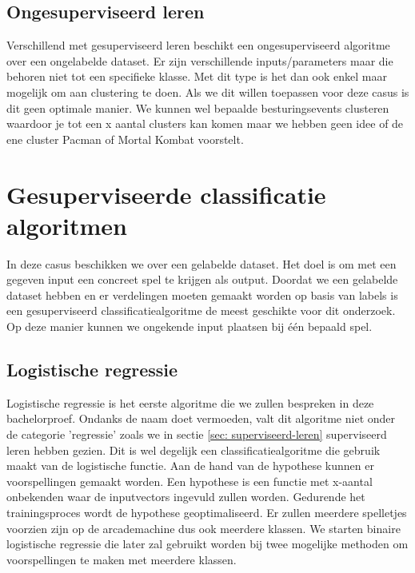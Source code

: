 \subsection*{Ongesuperviseerd leren}
\label{sec: ongesuperviseerd-leren}
Verschillend met gesuperviseerd leren beschikt een ongesuperviseerd algoritme over een ongelabelde dataset. Er zijn verschillende inputs/parameters maar die behoren niet tot een specifieke klasse. Met dit type is het dan ook enkel maar mogelijk om aan clustering te doen. Als we dit willen toepassen voor deze casus is dit geen optimale manier. We kunnen wel bepaalde besturingsevents clusteren waardoor je tot een x aantal clusters kan komen maar we hebben geen idee of de ene cluster Pacman of Mortal Kombat voorstelt. 




\section{Gesuperviseerde classificatie algoritmen}
\label{sec:gesuperviseerde-classificatie-algoritmen}

In deze casus beschikken we over een gelabelde dataset. Het doel is om met een gegeven input een concreet spel te krijgen als output. Doordat we een gelabelde dataset hebben en er verdelingen moeten gemaakt worden op basis van labels is een gesuperviseerd classificatiealgoritme de meest geschikte voor dit onderzoek. Op deze manier kunnen we ongekende input plaatsen bij één bepaald spel.


\subsection{Logistische regressie}
\label{sec:logistische-regressie}

Logistische regressie is het eerste algoritme die we zullen bespreken in deze bachelorproef. Ondanks de naam doet vermoeden, valt dit algoritme niet onder de categorie 'regressie' zoals we in sectie \ref{sec: superviseerd-leren} superviseerd leren hebben gezien. Dit is wel degelijk een classificatiealgoritme die gebruik maakt van de logistische functie. Aan de hand van de hypothese kunnen er voorspellingen gemaakt worden. Een hypothese is een functie met x-aantal onbekenden waar de inputvectors ingevuld zullen worden. Gedurende het trainingsproces wordt de hypothese geoptimaliseerd. Er zullen meerdere spelletjes voorzien zijn op de arcademachine dus ook meerdere klassen. We starten binaire logistische regressie die later zal gebruikt worden bij twee mogelijke methoden om voorspellingen te maken met meerdere klassen. 

